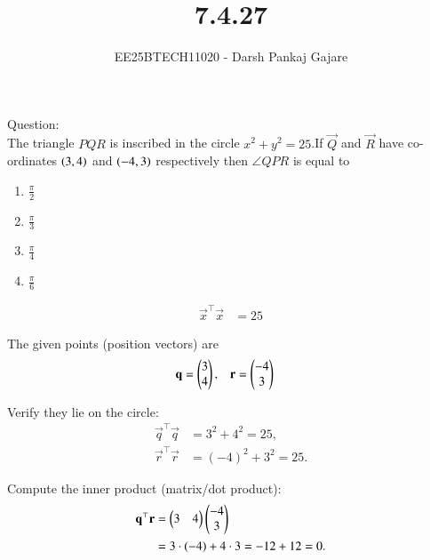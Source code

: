 \documentclass[journal,12pt,onecolumn]{IEEEtran}
\begin{document}
\title{7.4.27}
\author{EE25BTECH11020 - Darsh Pankaj Gajare}
{\let\newpage\relax\maketitle}
Question:\\
The triangle $PQR$ is inscribed in the circle $x^2+y^2=25$.If $\vec{Q}$ and $\vec{R}$ have co-ordinates $\left(3,4\right)$ and $\left(-4,3\right)$ respectively then $\angle QPR$ is equal to
\begin{multicols}{4}
	\begin{enumerate}
		\item $\frac{\pi}{2}$
		\item $\frac{\pi}{3}$
		\item $\frac{\pi}{4}$
		\item $\frac{\pi}{6}$
	\end{enumerate}
\end{multicols}
\solution
\begin{table}[H]
	\centering
	\caption{}
	
	\label{}
\end{table}
\begin{align}
\vec{x}^\top\vec{x} &= 25
\end{align}

The given points (position vectors) are
\begin{align}
\mathbf{q} &= \begin{pmatrix}3\\4\end{pmatrix}, & \mathbf{r} &= \begin{pmatrix}-4\\3\end{pmatrix}
\end{align}

Verify they lie on the circle:
\begin{align}
\vec{q}^\top\vec{q} &= 3^2+4^2 = 25, \\
\vec{r}^\top\vec{r} &= (-4)^2+3^2 = 25.
\end{align}

Compute the inner product (matrix/dot product):
\begin{align}
\mathbf{q}^\top\mathbf{r} &= \begin{pmatrix}3 & 4\end{pmatrix}\begin{pmatrix}-4\\3\end{pmatrix} \\
&= 3\cdot(-4) + 4\cdot 3 = -12 + 12 = 0.
\end{align}
\end{document}
